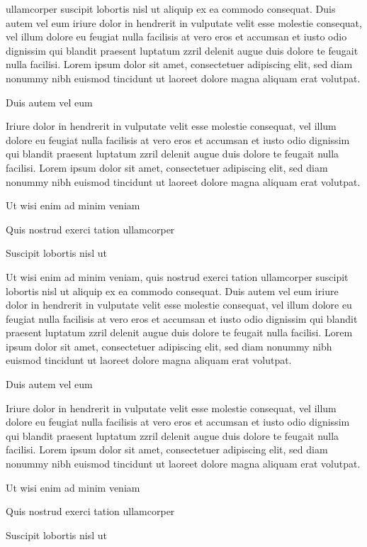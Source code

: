 \documentclass[11pt,twoside]{article}\makeatletter
\begin{document}
      ullamcorper suscipit lobortis nisl ut aliquip ex ea commodo
      consequat. Duis autem vel eum iriure dolor in hendrerit in vulputate
      velit esse molestie consequat, vel illum dolore eu feugiat nulla
      facilisis at vero eros et accumsan et iusto odio dignissim qui blandit
      praesent luptatum zzril delenit augue duis dolore te feugait nulla
      facilisi. Lorem ipsum dolor sit amet, consectetuer adipiscing elit,
      sed diam nonummy nibh euismod tincidunt ut laoreet dolore magna
      aliquam erat volutpat. \par Duis autem vel eum \par Iriure dolor in hendrerit in vulputate velit esse molestie
      consequat, vel illum dolore eu feugiat nulla facilisis at vero eros et
      accumsan et iusto odio dignissim qui blandit praesent luptatum zzril
      delenit augue duis dolore te feugait nulla facilisi. Lorem ipsum dolor
      sit amet, consectetuer adipiscing elit, sed diam nonummy nibh euismod
      tincidunt ut laoreet dolore magna aliquam erat volutpat. \par Ut wisi enim ad minim veniam\par Quis nostrud exerci tation ullamcorper \par Suscipit lobortis nisl ut \par Ut wisi enim ad minim veniam, quis nostrud exerci tation
      ullamcorper suscipit lobortis nisl ut aliquip ex ea commodo
      consequat. Duis autem vel eum iriure dolor in hendrerit in vulputate
      velit esse molestie consequat, vel illum dolore eu feugiat nulla
      facilisis at vero eros et accumsan et iusto odio dignissim qui blandit
      praesent luptatum zzril delenit augue duis dolore te feugait nulla
      facilisi. Lorem ipsum dolor sit amet, consectetuer adipiscing elit,
      sed diam nonummy nibh euismod tincidunt ut laoreet dolore magna
      aliquam erat volutpat. \par Duis autem vel eum \par Iriure dolor in hendrerit in vulputate velit esse molestie
      consequat, vel illum dolore eu feugiat nulla facilisis at vero eros et
      accumsan et iusto odio dignissim qui blandit praesent luptatum zzril
      delenit augue duis dolore te feugait nulla facilisi. Lorem ipsum dolor
      sit amet, consectetuer adipiscing elit, sed diam nonummy nibh euismod
      tincidunt ut laoreet dolore magna aliquam erat volutpat. \par Ut wisi enim ad minim veniam\par Quis nostrud exerci tation ullamcorper \par Suscipit lobortis nisl ut 
\end{document}
